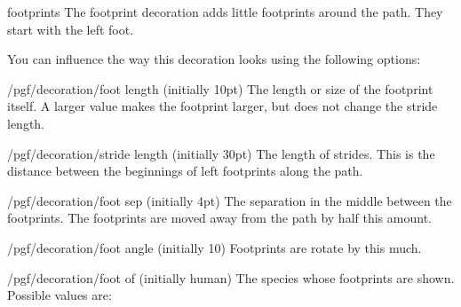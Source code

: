 \begin{decoration}{footprints}
  The footprint decoration adds little footprints around the
  path. They start with the left foot.
\begin{codeexample}[]
\end{codeexample}
  You can influence the way this decoration looks using the following
  options:
  \begin{key}{/pgf/decoration/foot length (initially 10pt)}
    The length or size of the footprint itself. A larger value makes
    the footprint larger, but does not change the stride length.
\begin{codeexample}[]
\end{codeexample}
  \end{key}
  \begin{key}{/pgf/decoration/stride length (initially 30pt)}
    The length of strides. This is the distance between the beginnings
    of left footprints along the path.
\begin{codeexample}[]
\end{codeexample}
  \end{key}
  \begin{key}{/pgf/decoration/foot sep (initially 4pt)}
    The separation in the middle between the footprints. The
    footprints are moved away from the path by half this amount.
\begin{codeexample}[]
\end{codeexample}
  \end{key}
  \begin{key}{/pgf/decoration/foot angle (initially 10)}
    Footprints are rotate by this much.
\begin{codeexample}[]
\end{codeexample}
  \end{key}
  \begin{key}{/pgf/decoration/foot of (initially human)}
    The species whose footprints are shown. Possible values are:


\end{key}
\end{decoration}
